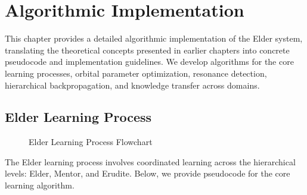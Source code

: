 \chapter{Algorithmic Implementation}

\begin{tcolorbox}[colback=DarkSkyBlue!5!white,colframe=DarkSkyBlue!75!black,title=Chapter Summary]
This chapter provides a detailed algorithmic implementation of the Elder system, translating the theoretical concepts presented in earlier chapters into concrete pseudocode and implementation guidelines. We develop algorithms for the core learning processes, orbital parameter optimization, resonance detection, hierarchical backpropagation, and knowledge transfer across domains.
\end{tcolorbox}

\section{Elder Learning Process}

\begin{figure}[htbp]
\centering

\caption{Elder Learning Process Flowchart}
\label{fig:learning_process_flowchart}
\end{figure}

The Elder learning process involves coordinated learning across the hierarchical levels: Elder, Mentor, and Erudite. Below, we provide pseudocode for the core learning algorithm.

